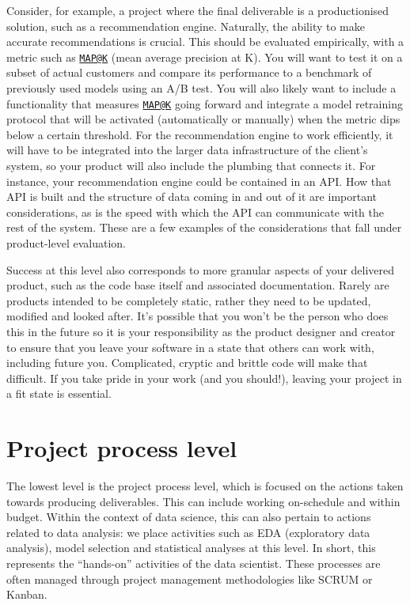 \documentclass[
]{book}
\begin{document}
Consider, for example, a project where the final deliverable is a
productionised solution, such as a recommendation engine. Naturally, the
ability to make accurate recommendations is crucial. This should be
evaluated empirically, with a metric such as
\href{mailto:MAP@K}{\nolinkurl{MAP@K}} (mean average precision at K).
You will want to test it on a subset of actual customers and compare its
performance to a benchmark of previously used models using an A/B test.
You will also likely want to include a functionality that measures
\href{mailto:MAP@K}{\nolinkurl{MAP@K}} going forward and integrate a
model retraining protocol that will be activated (automatically or
manually) when the metric dips below a certain threshold. For the
recommendation engine to work efficiently, it will have to be integrated
into the larger data infrastructure of the client's system, so your
product will also include the plumbing that connects it. For instance,
your recommendation engine could be contained in an API. How that API is
built and the structure of data coming in and out of it are important
considerations, as is the speed with which the API can communicate with
the rest of the system. These are a few examples of the considerations
that fall under product-level evaluation.

Success at this level also corresponds to more granular aspects of your
delivered product, such as the code base itself and associated
documentation. Rarely are products intended to be completely static,
rather they need to be updated, modified and looked after. It's possible
that you won't be the person who does this in the future so it is your
responsibility as the product designer and creator to ensure that you
leave your software in a state that others can work with, including
future you. Complicated, cryptic and brittle code will make that
difficult. If you take pride in your work (and you should!), leaving
your project in a fit state is essential.

\hypertarget{project-process-level}{%
\section{Project process level}\label{project-process-level}}

The lowest level is the project process level, which is focused on the
actions taken towards producing deliverables. This can include working
on-schedule and within budget. Within the context of data science, this
can also pertain to actions related to data analysis: we place
activities such as EDA (exploratory data analysis), model selection and
statistical analyses at this level. In short, this represents the
``hands-on'' activities of the data scientist. These processes are often
managed through project management methodologies like SCRUM or Kanban.
\end{document}
